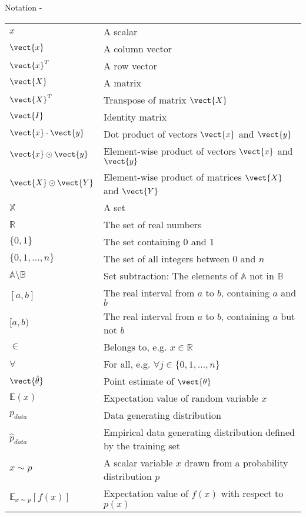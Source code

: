 
\begin{frame}[allowframebreaks,t]{Notation -}

    {
\small    

\begin{longtable}{| p{} | p{} |} 
$x$                       & A scalar \\
$\vect{x}$                & A column vector \\
$\vect{x}^T$              & A row vector \\
$\vect{X}$                & A matrix \\
$\vect{X}^T$              & Transpose of matrix  $\vect{X}$ \\
$\vect{I}$                & Identity matrix \\
$\vect{x} \cdot \vect{y}$ & Dot product of vectors $\vect{x}$ and $\vect{y}$ \\
$\vect{x} \odot \vect{y}$ & Element-wise product of vectors $\vect{x}$ and $\vect{y}$ \\
$\vect{X} \odot \vect{Y}$ & Element-wise product of matrices $\vect{X}$ and $\vect{Y}$ \\
$\mathbb{X}$              & A set \\
$\mathbb{R}$              & The set of real numbers \\
$\{0,1\}$                 & The set containing 0 and 1 \\
$\{0,1,...,n\}$           & The set of all integers between 0 and $n$ \\
$\mathbb{A}\setminus\mathbb{B}$  
                          & Set subtraction: The elements of $\mathbb{A}$ not in $\mathbb{B}$\\
$[a,b]$                   & The real interval from $a$ to $b$, containing $a$ and $b$\\
$[a,b)$                   & The real interval from $a$ to $b$, containing $a$ but not $b$\\
$\in$                     & Belongs to, e.g. $x \in \mathbb{R}$ \\
$\forall$                 & For all, e.g. $\forall j \in \{0,1,...,n\}$ \\
$\vect{\hat{\theta}}$     & Point estimate of $\vect{\theta}$ \\
$\mathbb{E}(x)$           & Expectation value of random variable $x$ \\
$p_{data}$                & Data generating distribution \\
$\hat{p}_{data}$          & Empirical data generating distribution defined by the training set\\
$x{\sim}p$                & A scalar variable $x$ drawn from a probability distribution $p$\\
$\mathbb{E}_{x{\sim}p}[f(x)]$           
                          & Expectation value of $f(x)$ with respect to $p(x)$\\
\end{longtable}
}
\end{frame}
